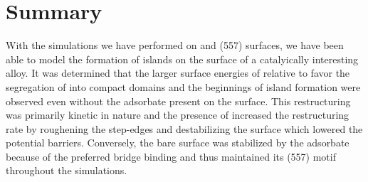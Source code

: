 \section{Summary}

With the simulations we have performed on  and  (557)
surfaces, we have been able to model the formation of  islands on the
surface of a catalyically interesting alloy. It was determined that the larger
surface energies of  relative to  favor the segregation of
 into compact domains and the beginnings of island formation were
observed even without the  adsorbate present on the surface. This
restructuring was primarily kinetic in nature and the presence of 
increased the restructuring rate by roughening the step-edges and
destabilizing the surface which lowered the potential barriers. Conversely,
the bare  surface was stabilized by the  adsorbate because of
the preferred bridge binding and thus maintained its (557) motif throughout
the simulations.

%
%


